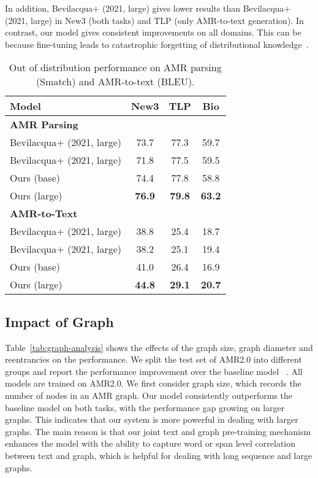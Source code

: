 \documentclass[11pt]{article}
\begin{document}
In addition, Bevilacqua+ (2021, large) gives lower results than Bevilacqua+ (2021, large) in New3 (both tasks) and TLP (only AMR-to-text generation). 
In contrast, our model gives consistent improvements on all  domains. 
This can be because fine-tuning leads to catastrophic forgetting of distributional knowledge~\cite{Kirkpatrick2017OvercomingCF}.


\begin{table}[t]
	\centering
	\small
	\begin{tabular}{lccc}
		\toprule
		\textbf{Model}& \textbf{New3} &\textbf{TLP} &\textbf{Bio} \\
		\midrule
		\textbf{AMR Parsing} & & & \\
		Bevilacqua+ (2021, large) &73.7 &77.3 &59.7 \\
		Bevilacqua+ (2021, large) &71.8 &77.5 &59.5 \\
		\rowcolor{mygray}
		Ours (base) &74.4 &77.8 &58.8 \\
		\rowcolor{mygray}
		Ours (large) &\textbf{76.9} &\textbf{79.8} &\textbf{63.2} \\
\midrule
		\textbf{AMR-to-Text} & & & \\
		Bevilacqua+ (2021, large) &38.8 &25.4 &18.7 \\
		Bevilacqua+ (2021, large) &38.2 &25.1 &19.4 \\
		\rowcolor{mygray}
		Ours (base) &41.0 &26.4 &16.9 \\
		\rowcolor{mygray}
		Ours (large) &\textbf{44.8} &\textbf{29.1} &\textbf{20.7} \\
\bottomrule
	\end{tabular}
	\caption{Out of distribution performance on AMR parsing (Smatch) and AMR-to-text (BLEU).}
	\label{tab:ood}
\end{table}

\subsection{Impact of Graph}

Table~\ref{tab:graph-analysis} shows the effects of the graph size, graph diameter and reentrancies on the performance. 
We split the test set of AMR2.0 into different groups and report the performance improvement over the baseline model ~\cite{Bevilacqua_Blloshmi_Navigli_2021}. 
All models are trained on AMR2.0.
We first consider graph size, which records the number of nodes in an AMR graph.
Our model consistently outperforms the baseline model on both tasks, with the performance gap growing on larger graphs. 
This indicates that our system is more powerful in dealing with larger graphs.
The main reason is that our joint text and graph pre-training mechanism enhances the model with the ability to capture word or span level correlation between text and graph, which is helpful for dealing with long sequence and large graphs.
\end{document}
